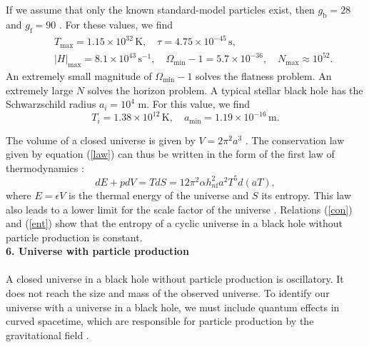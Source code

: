 \documentclass[prd,onecolumn,nofootinbib]{revtex4}
\begin{document}
If we assume that only the known standard-model particles exist, then $g_\textrm{b}=28$ and $g_\textrm{f}=90$ \cite{Ric}.
For these values, we find
\begin{eqnarray}
& & T_\textrm{max}=1.15\times 10^{32}\,\mbox{K},\quad\tau=4.75\times 10^{-45}\,\mbox{s}, \nonumber \\
& & |H|_\textrm{max}=8.1\times 10^{43}\,\mbox{s}^{-1},\quad\Omega_\textrm{min}-1=5.7\times 10^{-36},\quad N_\textrm{max}\approx 10^{52}.
\label{values}
\end{eqnarray}
An extremely small magnitude of $\Omega_\textrm{min}-1$ solves the flatness problem.
An extremely large $N$ solves the horizon problem.
A typical stellar black hole has the Schwarzschild radius $a_i=10^4$ m.
For this value, we find
\begin{equation}
T_i=1.38\times 10^{12}\,\mbox{K},\quad a_\textrm{min}=1.19\times 10^{-16}\,\mbox{m}.
\end{equation}

The volume of a closed universe is given by $V=2\pi^2 a^3$ \cite{LL2}.
The conservation law given by equation (\ref{law}) can thus be written in the form of the first law of thermodynamics \cite{Gar}:
\begin{equation}
dE+pdV=TdS=12\pi^2\alpha h_{n\textrm{f}}^2 a^2 T^5 d(aT),
\label{ent}
\end{equation}
where $E=\epsilon V$ is the thermal energy of the universe and $S$ its entropy.
This law also leads to a lower limit for the scale factor of the universe \cite{Gar}.
Relations (\ref{con}) and (\ref{ent}) show that the entropy of a cyclic universe in a black hole without particle production is constant.\\


{\bf 6. Universe with particle production}\\ \\
A closed universe in a black hole without particle production is oscillatory.
It does not reach the size and mass of the observed universe.
To identify our universe with a universe in a black hole, we must include quantum effects in curved spacetime, which are responsible for particle production by the gravitational field \cite{Zel}.
\end{document}
